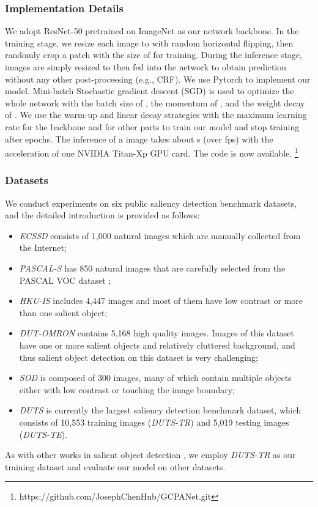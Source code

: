 \documentclass[letterpaper]{article} \usepackage{aaai20}  \usepackage{times}  \usepackage{helvet} \usepackage{courier}  \usepackage[hyphens]{url}  \usepackage{graphicx} \urlstyle{rm} \def\UrlFont{\rm}  \usepackage{graphicx}  \frenchspacing  \setlength{\pdfpagewidth}{8.5in}  \setlength{\pdfpageheight}{11in}
\begin{document}
\subsubsection{Implementation Details}
We adopt ResNet-50 \cite{he2016deep} pretrained on ImageNet \cite{deng2009imagenet} as our network backbone. 
In the training stage, we resize each image to  with random horizontal flipping,
then randomly crop a patch with the size of  for training. During the inference stage, 
images are simply resized to  then fed into the network to obtain prediction without any other post-processing (e.g., CRF).
We use Pytorch \cite{paszke2017automatic} to implement our model. 
Mini-batch Stochastic gradient descent (SGD) is used to optimize the whole network 
with the batch size of , the momentum of , and 
the weight decay of . 
We use the warm-up and linear decay strategies with the maximum learning rate  for the
backbone and  for other parts to 
train our model and stop training after  epochs.
The inference of a  image takes about s (over  fps) with the acceleration of one NVIDIA Titan-Xp GPU card. The code is now available. \footnote{https://github.com/JosephChenHub/GCPANet.git}
\subsubsection{Datasets} 
We conduct experiments on six public saliency detection
benchmark datasets, and the detailed introduction is provided as follows:
\begin{itemize}
\item \textit{ECSSD} \cite{yan2013hierarchical} consists of 1,000 natural images which are manually collected from the Internet; 
\item \textit{PASCAL-S} \cite{li2014secrets} has 850 natural images that are carefully selected from the PASCAL VOC dataset \cite{everingham2010pascal}; 
\item \textit{HKU-IS} \cite{li2015visual} includes 4,447 images and most of them have low contrast or more than one salient object; 
\item \textit{DUT-OMRON} \cite{yang2013saliency} contains 5,168 high quality images. Images of this dataset have one or more salient objects and relatively cluttered background, and thus salient object detection on this dataset is very challenging; 
\item \textit{SOD} \cite{movahedi2010design} is composed of 300 images, many of which contain multiple objects either with low contrast or touching the image boundary; 
\item \textit{DUTS} \cite{wang2017learning} is currently the largest saliency detection benchmark dataset,
which consists of 10,553 training images (\textit{DUTS-TR}) and 5,019 testing images (\textit{DUTS-TE}).
\end{itemize}
As with other works in salient object detection \cite{qin2019basnet,liu2019simple}, we employ \textit{DUTS-TR} as our training dataset and evaluate our model on other datasets. 
\end{document}
